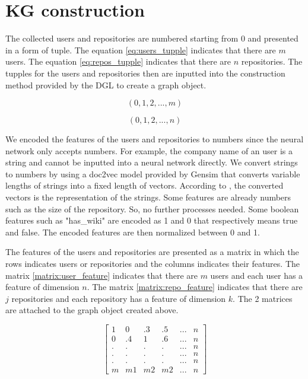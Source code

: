 \documentclass[11pt,twoside]{report}
\begin{document}
\section{KG construction}
The collected users and repositories are numbered starting from 0 and presented in a form of tuple. The equation \ref{eq:users_tupple} indicates that there are $m$ users. The equation \ref{eq:repos_tupple} indicates that there are $n$ repositories. The tupples for the users and repositories then are inputted into the construction method provided by the DGL to create a graph object. 

\begin{equation}
    (0, 1, 2, ..., m)
    \label{eq:users_tupple}
\end{equation}

\begin{equation}
    (0, 1, 2, ..., n)
    \label{eq:repos_tupple}
\end{equation}

We encoded the features of the users and repositories to numbers since the neural network only accepts numbers. For example, the company name of an user is a string and cannot be inputted into a neural network directly. We convert strings to numbers by using a doc2vec model \cite{le_distributed_nodate} provided by Gensim \cite{rehurek_lrec} that converts variable lengths of strings into a fixed length of vectors. According to \cite{mikolov_efficient_2013}, the converted vectors is the representation of the strings. Some features are already numbers such as the size of the repository. So, no further processes needed. Some boolean features such as "has\_wiki" are encoded as 1 and 0 that respectively means true and false. The encoded features are then normalized between 0 and 1.

The features of the users and repositories are presented as a matrix in which the rows indicates users or repositories and the columns indicates their features. The matrix \ref{matrix:user_feature} indicates that there are $m$ users and each user has a feature of dimension $n$. The matrix \ref{matrix:repo_feature} indicates that there are $j$ repositories and each repository has a feature of dimension $k$. The 2 matrices are attached to the graph object created above.

\begin{equation}
    \begin{bmatrix}
        1 & 0 & .3 & .5 & ... & n \\
        0 & .4 & 1 & .6 & ... & n \\
        . & . & . & . & ... & n \\
        . & . & . & . & ... & n \\
        . & . & . & . & ... & n \\
        m & m1 & m2 & m2 & ... & n
        \label{matrix:user_feature}
    \end{bmatrix}
\end{equation}
\end{document}
